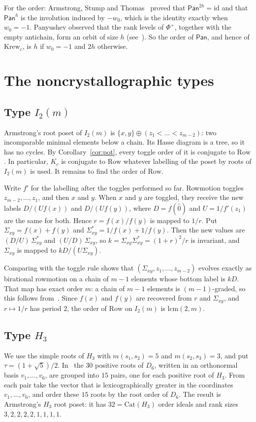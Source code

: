 \documentclass[11pt]{amsart}
\theoremstyle{definition}
\newcommand{\Row}{\mathrm{Row}}
\begin{document}
For the order: Armstrong, Stump and Thomas~\cite[Thm.~1.2]{AST} proved that $\mathsf{Pan}^{2h}=\mathrm{id}$ and that $\mathsf{Pan}^h$ is the involution induced by $-w_0$, which is the identity exactly when $w_0=-1$. Panyushev observed that the rank levels of $\Phi^+$, together with the empty antichain, form an orbit of size $h$ (see~\cite[\S1.3]{AST}). So the order of $\mathsf{Pan}$, and hence of $\mathrm{Krew}_c$, is $h$ if $w_0=-1$ and $2h$ otherwise.

\section{The noncrystallographic types}\label{sec:H3}

\subsection{\texorpdfstring{Type $I_2(m)$}{Type I2(m)}}
Armstrong's root poset of $I_2(m)$ is $\{x,y\}\oplus(z_1<\dots<z_{m-2})$: two incomparable minimal elements below a chain. Its Hasse diagram is a tree, so it has no cycles. By Corollary~\ref{cor:pot}, every toggle order of it is conjugate to $\Row$. In particular, $K_c$ is conjugate to $\Row$ whatever labelling of the poset by roots of $I_2(m)$ is used. It remains to find the order of $\Row$.

Write $f'$ for the labelling after the toggles performed so far. Rowmotion toggles $z_{m-2},\dots,z_1$, and then $x$ and $y$. When $x$ and $y$ are toggled, they receive the new labels $D/(Uf(x))$ and $D/(Uf(y))$, where $D=f(\hat0)$ and $U=1/f'(z_1)$ are the same for both. Hence $r=f(x)/f(y)$ is mapped to $1/r$. Put $\Sigma_{xy}=f(x)+f(y)$ and $\Sigma^*_{xy}=1/f(x)+1/f(y)$. Then the new values are $(D/U)\,\Sigma^*_{xy}$ and $(U/D)\,\Sigma_{xy}$, so $k=\Sigma_{xy}\Sigma^*_{xy}=(1+r)^2/r$ is invariant, and $\Sigma_{xy}$ is mapped to $kD/(U\Sigma_{xy})$.

Comparing with the toggle rule shows that $(\Sigma_{xy},z_1,\dots,z_{m-2})$ evolves exactly as birational rowmotion on a chain of $m-1$ elements whose bottom label is $kD$. That map has exact order $m$: a chain of $m-1$ elements is $(m-1)$-graded, so this follows from~\cite[Prop.~7.3]{GR1}. Since $f(x)$ and $f(y)$ are recovered from $r$ and $\Sigma_{xy}$, and $r\mapsto1/r$ has period $2$, the order of $\Row$ on $I_2(m)$ is $\mathrm{lcm}(2,m)$.

\subsection{\texorpdfstring{Type $H_3$}{Type H3}}
We use the simple roots of $H_3$ with $m(s_1,s_2)=5$ and $m(s_2,s_3)=3$, and put $\tau=(1+\sqrt5)/2$. In~\cite[\S3.2, Fig.~2]{CS} the $30$ positive roots of $D_6$, written in an orthonormal basis $v_1,\dots,v_6$, are grouped into $15$ pairs, one for each positive root of $H_3$. From each pair take the vector that is lexicographically greater in the coordinates $v_1,\dots,v_6$, and order these $15$ roots by the root order of $D_6$. The result is Armstrong's $H_3$ root poset: it has $32=\mathrm{Cat}(H_3)$ order ideals and rank sizes $3,2,2,2,2,1,1,1,1$.
\end{document}
